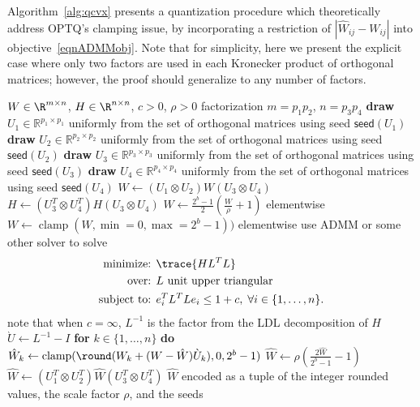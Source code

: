 \begin{toappendix}
Algorithm~\ref{alg:qcvx} presents a quantization procedure which theoretically address OPTQ's clamping issue, by incorporating a restriction of $|\hat W_{ij} - W_{ij}|$ into objective~\eqref{eqnADMMobj}.
Note that for simplicity, here we present the explicit case where only two factors are used in each Kronecker product of orthogonal matrices; however, the proof should generalize to any number of factors.
\begin{algorithm}
\caption{``Fixed'' Rounding via a Convex Program}\label{alg:qcvx}
\begin{algorithmic}
\Require $W \in \R^{m \times n}$, $H \in \R^{n \times n}$, $c > 0$, $\rho > 0$
\Require factorization $m = p_1 p_2$, $n = p_3 p_4$
\State \textbf{draw } $U_1 \in \mathbb{R}^{p_1 \times p_1}$ uniformly from the set of orthogonal matrices using seed $\mathsf{seed}(U_1)$
\State \textbf{draw } $U_2 \in \mathbb{R}^{p_2 \times p_2}$ uniformly from the set of orthogonal matrices using seed $\mathsf{seed}(U_2)$
\State \textbf{draw } $U_3 \in \mathbb{R}^{p_3 \times p_3}$ uniformly from the set of orthogonal matrices using seed $\mathsf{seed}(U_3)$
\State \textbf{draw } $U_4 \in \mathbb{R}^{p_4 \times p_4}$ uniformly from the set of orthogonal matrices using seed $\mathsf{seed}(U_4)$
\State $W \gets (U_1 \otimes U_2) W (U_3 \otimes U_4)$
\State $H \gets (U_3^T \otimes U_4^T) H (U_3 \otimes U_4)$
\State $W \gets \frac{2^b - 1}{2} \left( \frac{W}{\rho} + 1 \right)$ elementwise
\State $W \gets \operatorname{clamp}(W, \min=0, \max=2^{b}-1))$ elementwise
\State use ADMM or some other solver to solve
\begin{align*}
    \mbox{minimize: } & \trace{H L^T L} \\
    \mbox{over: } & L \text{ unit upper triangular} \\
    \mbox{subject to: } & e_i^T L^T L e_i \le 1 + c, \; \forall i \in \{1,\ldots,n\}.
\end{align*}
\State note that when $c = \infty$, $L^{-1}$ is the factor from the LDL decomposition of $H$
\State $\grave{U} \gets L^{-1} - I$
\State \textbf{for} $k \in \{1, \dots, n\}$ \textbf{do} 
$\hat W_k \gets \operatorname{clamp}(\round( W_k + (W - \hat W) \grave{U}_k ), 0, 2^b-1)$ 
\State $\hat W \gets \rho \left( \frac{2 \hat W}{2^b - 1} - 1 \right)$
\State $\hat W \gets (U_1^T \otimes U_2^T) \hat W (U_3^T \otimes U_4^T)$
\State \Return $\hat W$ encoded as a tuple of the integer rounded values, the scale factor $\rho$, and the seeds
\end{algorithmic}
\end{algorithm}



\end{toappendix}
